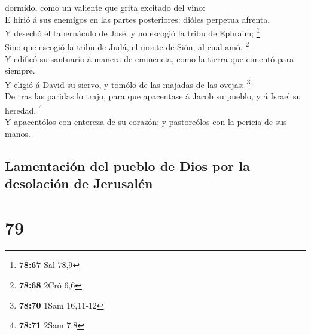 dormido, como un valiente que grita excitado del vino:\\
 E hirió á sus enemigos en las partes posteriores: dióles
perpetua afrenta.\\
 Y desechó el tabernáculo de José, y no escogió la tribu
de Ephraim; \footnote{\textbf{78:67} Sal 78,9}\\
 Sino que escogió la tribu de Judá, el monte de Sión, al
cual amó. \footnote{\textbf{78:68} 2Cró 6,6}\\
 Y edificó su santuario á manera de eminencia, como la
tierra que cimentó para siempre.\\
 Y eligió á David su siervo, y tomólo de las majadas de
las ovejas: \footnote{\textbf{78:70} 1Sam 16,11-12}\\
 De tras las paridas lo trajo, para que apacentase á
Jacob su pueblo, y á Israel su heredad. \footnote{\textbf{78:71} 2Sam
  7,8}\\
 Y apacentólos con entereza de su corazón; y pastoreólos
con la pericia de sus manos.

\hypertarget{lamentaciuxf3n-del-pueblo-de-dios-por-la-desolaciuxf3n-de-jerusaluxe9n}{%
\subsection{Lamentación del pueblo de Dios por la desolación de
Jerusalén}\label{lamentaciuxf3n-del-pueblo-de-dios-por-la-desolaciuxf3n-de-jerusaluxe9n}}

\hypertarget{section-78}{%
\section{79}\label{section-78}}

